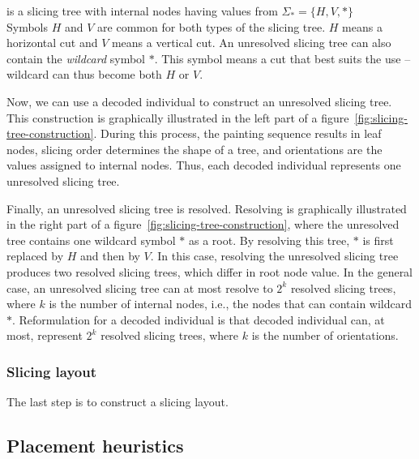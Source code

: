  is a slicing tree with internal nodes having values from $\Sigma_* = \{H, V, *\}$ \\

Symbols $H$ and $V$ are common for both types of the slicing tree.
$H$ means a horizontal cut and $V$ means a vertical cut.
An unresolved slicing tree can also contain the \textit{wildcard} symbol $*$.
This symbol means a cut that best suits the use – wildcard can thus become both $H$ or $V$.

Now, we can use a decoded individual to construct an unresolved slicing tree.
This construction is graphically illustrated in the left part of a figure~\ref{fig:slicing-tree-construction}.
During this process, the painting sequence results in leaf nodes, slicing order determines the shape of a tree, and orientations are the values assigned to internal nodes.
Thus, each decoded individual represents one unresolved slicing tree.

Finally, an unresolved slicing tree is resolved.
Resolving is graphically illustrated in the right part of a figure~\ref{fig:slicing-tree-construction},
where the unresolved tree contains one wildcard symbol $*$ as a root.
By resolving this tree, $*$ is first replaced by $H$ and then by $V$.
In this case, resolving the unresolved slicing tree produces two resolved slicing trees,
which differ in root node value.
In the general case, an unresolved slicing tree can at most resolve to $2^k$ resolved slicing trees,
where $k$ is the number of internal nodes, i.e., the nodes that can contain wildcard $*$.
Reformulation for a decoded individual is that decoded individual can, at most, represent
$2^k$ resolved slicing trees, where $k$ is the number of orientations.

\subsubsection*{Slicing layout}

The last step is to construct a slicing layout.



\subsection{Placement heuristics}\label{subsec:placement-heuristics}
